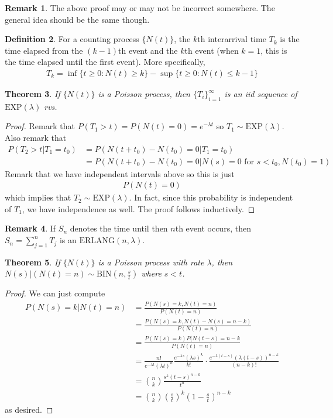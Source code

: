\documentclass[11pt]{amsart}
\newtheorem{theorem}{Theorem}[section]
\theoremstyle{definition}
\newtheorem{definition}[theorem]{Definition}
\newtheorem{remark}[theorem]{Remark}
\numberwithin{equation}{section}
\begin{document}
 \begin{remark}
     The above proof may or may not be incorrect somewhere. The general idea should be the same though.
 \end{remark}
 \begin{definition}
     For a counting process $\{N(t)\}$, the $k$th interarrival time $T_k$ is the time elapsed from the $(k-1)$th event and the $k$th event (when $k=1$, this is the time elapsed until the first event). More specifically,
     \begin{align*}
         T_k=\inf\{t\ge 0:N(t)\ge k\}-\sup\{t\ge 0:N(t)\le k-1\}
     \end{align*}
 \end{definition}
 \begin{theorem}
     If $\{N(t)\}$ is a Poisson process, then $\{T_i\}_{i=1}^\infty$ is an iid sequence of $\mathrm{EXP}(\lambda)$ rvs. 
 \end{theorem}
 \begin{proof}
     Remark that $P(T_1>t)=P(N(t)=0)=e^{-\lambda t}$ so $T_1\sim\mathrm{EXP}(\lambda)$. Also remark that 
     \begin{align*}
         P(T_2>t|T_1=t_0)&=P(N(t+t_0)-N(t_0)=0|T_1=t_0)\\
         &=P(N(t+t_0)-N(t_0)=0|N(s)=0\text{ for }s<t_0,N(t_0)=1)
     \end{align*}
     Remark that we have independent intervals above so this is just
     \begin{align*}
         P(N(t)=0)
     \end{align*}
     which implies that $T_2\sim\mathrm{EXP}(\lambda)$. In fact, since this probability is independent of $T_1$, we have independence as well. The proof follows inductively.
 \end{proof}
 \begin{remark}
     If $S_n$ denotes the time until then $n$th event occurs, then $S_n=\sum_{j=1}^nT_j$ is an $\mathrm{ERLANG}(n,\lambda)$.
 \end{remark}
 \begin{theorem}
     If $\{N(t)\}$ is a Poisson process with rate $\lambda$, then $N(s)|(N(t)=n)\sim\mathrm{BIN}(n,\frac{s}{t})$ where $s<t$.
 \end{theorem}
 \begin{proof}
     We can just compute
     \begin{align*}
         P(N(s)=k|N(t)=n)&=\frac{P(N(s)=k,N(t)=n)}{P(N(t)=n)}\\
         &=\frac{P(N(s)=k,N(t)-N(s)=n-k)}{P(N(t)=n)}\\
         &=\frac{P(N(s)=k)P(N(t-s)=n-k}{P(N(t)=n)}\\
         &=\frac{n!}{e^{-\lambda t}(\lambda t)^n}{\frac{e^{-\lambda s}(\lambda s)^k}{k!}\cdot\frac{e^{-\lambda(t-s)}(\lambda(t-s))^{n-k}}{(n-k)!}}\\
         &=\binom{n}{k}\frac{s^k(t-s)^{n-k}}{t^n}\\
         &=\binom{n}{k}\left(\frac{s}{t}\right)^k\left(1-\frac{s}{t}\right)^{n-k}
     \end{align*}
     as desired.
 \end{proof}
\end{document}
